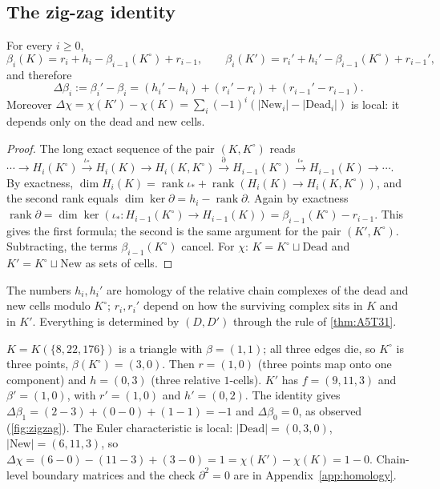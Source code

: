 \subsection{The zig-zag identity}
\begin{theorem}\label{thm:zigzag}
For every $i\ge0$,
\[
\beta_i(K)=r_i+h_i-\beta_{i-1}(K^\circ)+r_{i-1},\qquad \beta_i(K')=r_i'+h_i'-\beta_{i-1}(K^\circ)+r_{i-1}',
\]
and therefore
\[
\Delta\beta_i:=\beta_i'-\beta_i=(h_i'-h_i)+(r_i'-r_i)+(r_{i-1}'-r_{i-1}).
\]
Moreover $\Delta\chi=\chi(K')-\chi(K)=\sum_i(-1)^i(|\mathrm{New}_i|-|\mathrm{Dead}_i|)$ is local: it depends only on the dead and new cells.
\end{theorem}
\begin{proof}
The long exact sequence of the pair $(K,K^\circ)$ reads $\cdots\to H_i(K^\circ)\xrightarrow{\iota_*}H_i(K)\to H_i(K,K^\circ)\xrightarrow{\partial}H_{i-1}(K^\circ)\xrightarrow{\iota_*}H_{i-1}(K)\to\cdots$. By exactness, $\dim H_i(K)=\operatorname{rank}\iota_*+\operatorname{rank}(H_i(K)\to H_i(K,K^\circ))$, and the second rank equals $\dim\ker\partial=h_i-\operatorname{rank}\partial$. Again by exactness $\operatorname{rank}\partial=\dim\ker(\iota_*:H_{i-1}(K^\circ)\to H_{i-1}(K))=\beta_{i-1}(K^\circ)-r_{i-1}$. This gives the first formula; the second is the same argument for the pair $(K',K^\circ)$. Subtracting, the terms $\beta_{i-1}(K^\circ)$ cancel. For $\chi$: $K=K^\circ\sqcup\mathrm{Dead}$ and $K'=K^\circ\sqcup\mathrm{New}$ as sets of cells. \qedhere
\end{proof}
\begin{remark}
The numbers $h_i,h_i'$ are homology of the relative chain complexes of the dead and new cells modulo $K^\circ$; $r_i,r_i'$ depend on how the surviving complex sits in $K$ and in $K'$. Everything is determined by $(D,D')$ through the rule of \cref{thm:A5T31}.
\end{remark}
\begin{example}\label{ex:zigzag}
$K=K(\{8,22,176\})$ is a triangle with $\beta=(1,1)$; all three edges die, so $K^\circ$ is three points, $\beta(K^\circ)=(3,0)$. Then $r=(1,0)$ (three points map onto one component) and $h=(0,3)$ (three relative $1$-cells). $K'$ has $f=(9,11,3)$ and $\beta'=(1,0)$, with $r'=(1,0)$ and $h'=(0,2)$. The identity gives $\Delta\beta_1=(2-3)+(0-0)+(1-1)=-1$ and $\Delta\beta_0=0$, as observed (\cref{fig:zigzag}). The Euler characteristic is local: $|\mathrm{Dead}|=(0,3,0)$, $|\mathrm{New}|=(6,11,3)$, so $\Delta\chi=(6-0)-(11-3)+(3-0)=1=\chi(K')-\chi(K)=1-0$. Chain-level boundary matrices and the check $\partial^2=0$ are in Appendix~\ref{app:homology}.
\end{example}
